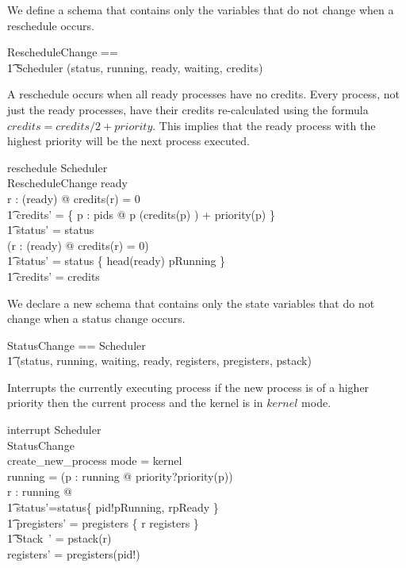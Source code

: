 \documentclass{article}
\begin{document}
We define a schema that contains only the variables that do not change
when a reschedule occurs.

\begin{zed}
  RescheduleChange == \\
    \t1 Scheduler \hide (status, running, ready, waiting, credits)
\end{zed}

A reschedule occurs when all ready processes have no credits. Every
process, not just the ready processes, have their credits
re-calculated using the formula $credits = credits/2 + priority$. This
implies that the ready process with the highest priority will be the
next process executed.

\begin{schema}{reschedule}
  \Delta Scheduler\\
  \Xi RescheduleChange
\where
  ready \neq \emptyset\\
  \forall r : \ran(ready) @ credits(r) = 0 \implies\\
    \t1 credits' =
      \{ p : pids @ p \mapsto (credits(p) ) + priority(p) \} \land\\
    \t1 status' = status\\
  \lnot (\forall r : \ran(ready) @ credits(r) = 0) \implies\\
    \t1 status' = status \oplus \{ head(ready) \mapsto pRunning \} \land\\ 
    \t1 credits' = credits
\end{schema}

We declare a new schema that contains only the state variables that do
not change when a status change occurs.

\begin{zed}
  StatusChange == Scheduler \hide\\
    \t1 (status, running, waiting, ready, registers, pregisters, pstack)
\end{zed}

Interrupts the currently executing process if the new process is of a
higher priority then the current process and the kernel is in $kernel$
mode.

\begin{schema}{interrupt}
  \Delta Scheduler\\
  \Xi StatusChange\\
  create\_new\_process
\where
  mode = kernel\\
  running = \emptyset\lor(\exists p : running @ priority?\geq priority(p))\\
  \exists r : running @\\
    \t1 status'=status\oplus\{ pid!\mapsto pRunning, r\mapsto pReady \}\land\\
    \t1 pregisters' = pregisters \oplus \{ r \mapsto registers \} \land\\
    \t1 \theta Stack~' = pstack(r)\\
  registers' = pregisters(pid!)
\end{schema}
\end{document}
